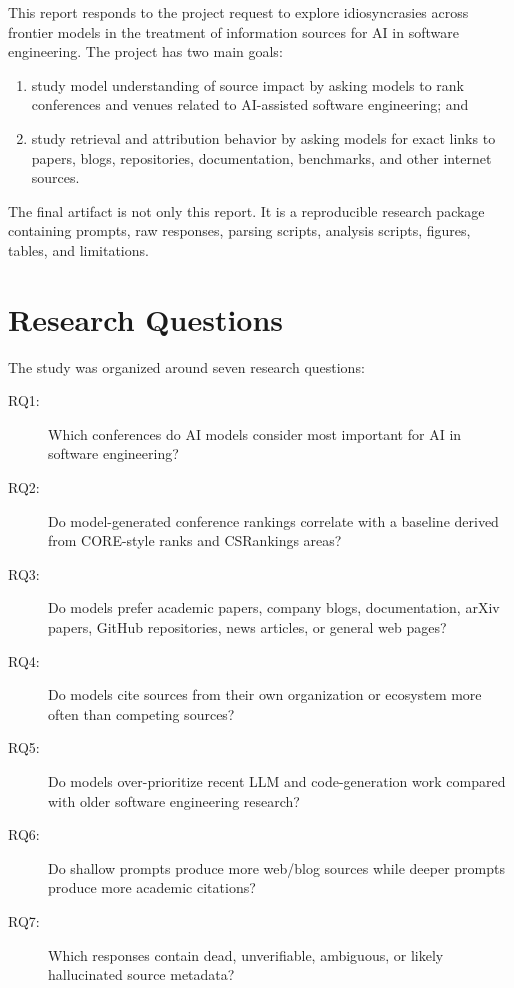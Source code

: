 \documentclass[acmsmall,review,nonacm]{acmart}
\begin{document}
This report responds to the project request to explore idiosyncrasies across
frontier models in the treatment of information sources for AI in software
engineering. The project has two main goals:

\begin{enumerate}
  \item study model understanding of source impact by asking models to rank
  conferences and venues related to AI-assisted software engineering; and
  \item study retrieval and attribution behavior by asking models for exact
  links to papers, blogs, repositories, documentation, benchmarks, and other
  internet sources.
\end{enumerate}

The final artifact is not only this report. It is a reproducible research
package containing prompts, raw responses, parsing scripts, analysis scripts,
figures, tables, and limitations.

\section{Research Questions}

The study was organized around seven research questions:

\begin{description}
  \item[RQ1:] Which conferences do AI models consider most important for AI in
  software engineering?
  \item[RQ2:] Do model-generated conference rankings correlate with a baseline
  derived from CORE-style ranks and CSRankings areas?
  \item[RQ3:] Do models prefer academic papers, company blogs, documentation,
  arXiv papers, GitHub repositories, news articles, or general web pages?
  \item[RQ4:] Do models cite sources from their own organization or ecosystem
  more often than competing sources?
  \item[RQ5:] Do models over-prioritize recent LLM and code-generation work
  compared with older software engineering research?
  \item[RQ6:] Do shallow prompts produce more web/blog sources while deeper
  prompts produce more academic citations?
  \item[RQ7:] Which responses contain dead, unverifiable, ambiguous, or likely
  hallucinated source metadata?
\end{description}
\end{document}
